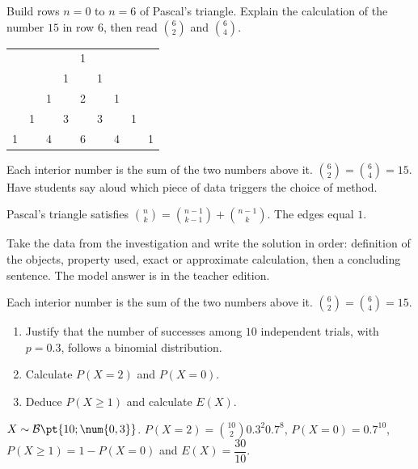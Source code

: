 \begin{activity}
Build rows $n=0$ to $n=6$ of Pascal's triangle. Explain the calculation of the number $15$ in row $6$, then read $\binom62$ and $\binom64$.
\begin{center}\begin{tabular}{*{9}{c}}&&&&1&&&&\\&&&1&&1&&&\\&&1&&2&&1&&\\&1&&3&&3&&1&\\1&&4&&6&&4&&1\end{tabular}\end{center}
\end{activity}
\begin{solution}Each interior number is the sum of the two numbers above it. $\binom62=\binom64=15$. Have students say aloud which piece of data triggers the choice of method.\end{solution}

\begin{summary}Pascal's triangle satisfies $\binom nk=\binom{n-1}{k-1}+\binom{n-1}{k}$. The edges equal $1$.\end{summary}

\begin{example}
Take the data from the investigation and write the solution in order: definition of the objects, property used, exact or approximate calculation, then a concluding sentence. The model answer is in the teacher edition.
\end{example}
\begin{solution}Each interior number is the sum of the two numbers above it. $\binom62=\binom64=15$.\end{solution}

\begin{exercise}[essential]
\begin{enumerate}\item Justify that the number of successes among $10$ independent trials, with $p=\num{0,3}$, follows a binomial distribution.\item Calculate $P(X=2)$ and $P(X=0)$.\item Deduce $P(X\geq1)$ and calculate $E(X)$.\end{enumerate}
\end{exercise}
\begin{solution}$X\sim\mathcal B\pt{10;\num{0,3}}$. $P(X=2)=\binom{10}2 \num{0,3}^2 \num{0,7}^{8}$, $P(X=0)=\num{0,7}^{10}$, $P(X\geq1)=1-P(X=0)$ and $E(X)=\dfrac{30}{10}$.\end{solution}

